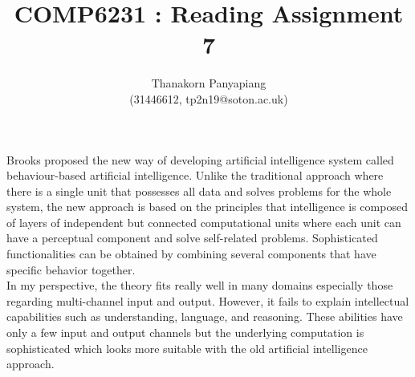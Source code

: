 \documentclass{article}
\title{COMP6231 : Reading Assignment 7}
\author{Thanakorn Panyapiang\\
(31446612, tp2n19@soton.ac.uk)}
\date{}
\begin{document}
\maketitle

Brooks proposed the new way of developing artificial intelligence system called behaviour-based artificial intelligence. Unlike the traditional approach where there is a single unit that possesses all data and solves problems for the whole system, the new approach is based on the principles that intelligence is composed of layers of independent but connected computational units where each unit can have a perceptual component and solve self-related problems. Sophisticated functionalities can be obtained by combining several components that have specific behavior together.\\
\indent In my perspective, the theory fits really well in many domains especially those regarding multi-channel input and output. However, it fails to explain intellectual capabilities such as understanding, language, and reasoning. These abilities have only a few input and output channels but the underlying computation is sophisticated which looks more suitable with the old artificial intelligence approach.
\end{document}
